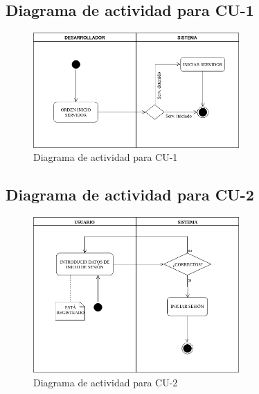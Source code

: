 \subsection{Diagrama de actividad para CU-1 }
\begin{figure}[H]
  \begin{center}
    \includegraphics[width=0.7\textwidth]{imagenes/DA-CU-1.png}
    \caption{Diagrama de actividad para CU-1}
    \label{fig:DA-CU-1}
  \end{center}
\end{figure}
\subsection{Diagrama de actividad para CU-2 }
\begin{figure}[H]
  \begin{center}
    \includegraphics[width=0.7\textwidth]{imagenes/DA-CU-2.png}
    \caption{Diagrama de actividad para CU-2}
    \label{fig:DA-CU-2}
  \end{center}
\end{figure}
